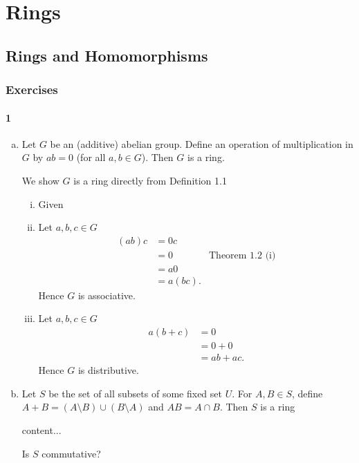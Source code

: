 \chapter{Rings}


\section{Rings and Homomorphisms}

\subsection{Exercises}

\subsubsection*{1}
\begin{enumerate}[(a)]
	\item
	\begin{graybox}
		Let $G$ be an (additive) abelian group. Define an operation of multiplication in $G$ by $ab = 0$ (for all $a, b\in G$). Then $G$ is a ring.
	\end{graybox}
	\begin{solution}
		We show $G$ is a ring directly from Definition 1.1
		\begin{enumerate}[(i)]
			\item Given
			
			\item Let $a,b,c \in G$
			\begin{align*}
				(ab)c &= 0c\\
				&= 0 & \text{Theorem 1.2 (i)}\\
				&= a0\\
				&= a(bc).
			\end{align*}
			Hence $G$ is associative.
			
			\item Let $a,b,c \in G$
			\begin{align*}
				a(b + c) &= 0\\
				&= 0 + 0\\
				&= ab + ac.
			\end{align*}
			Hence $G$ is distributive.
		\end{enumerate}
	\end{solution}
	\item
	\begin{graybox}
		Let $S$ be the set of all subsets of some fixed set $U$. For $A, B \in S$, define $A + B = (A \setminus B) \cup (B \setminus A)$ and $AB = A \cap B$. Then $S$ is a ring
	\end{graybox}
	\begin{solution}
		content...
	\end{solution}
	\begin{lightgraybox}
		Is $S$ commutative?
	\end{lightgraybox}
	

\end{enumerate}
